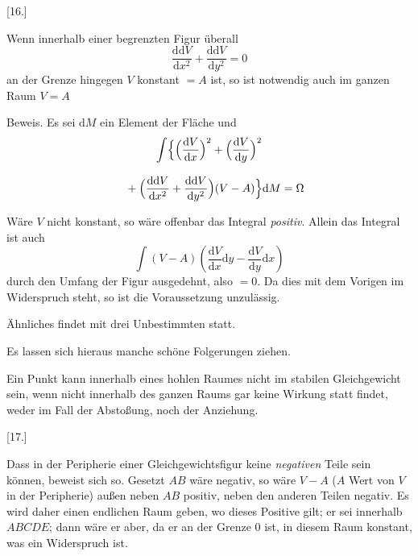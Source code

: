 \begingroup
\renewcommand{\arraystretch}{1.45}

\par\medskip{}\centerline{[16.]}\nobreak\smallskip
Wenn innerhalb einer begrenzten Figur überall
\[
\frac{\mathrm{dd}V}{\mathrm{d}x^2}
+\frac{\mathrm{dd}V}{\mathrm{d}y^2}=0
\]
an der Grenze hingegen $V$ konstant $=A$ ist, so ist notwendig auch im ganzen Raum $V=A$


Beweis. Es sei $\mathrm{d}M$ ein Element der Fläche und
\[
\begin{gathered}\int\Bigl\{
\Bigl(\frac{\mathrm{d}V}{\mathrm{d}x}\Bigr)^2
+\Bigl(\frac{\mathrm{d}V}{\mathrm{d}y}\Bigr)^2
\\[8pt]\quad{}+\Bigl(\frac{\mathrm{dd}V}{\mathrm{d}x^2}
+\frac{\mathrm{dd}V}{\mathrm{d}y^2}\Bigr)(V-A)
\Bigr\}\mathrm{d}M=\Omega\end{gathered}
\]



Wäre $V$ nicht konstant, so wäre offenbar das Integral \emph{positiv}. Allein das Integral ist auch
\[
\int(V-A)\left(\frac{\mathrm{d}V}{\mathrm{d}x}\mathrm{d}y
-\frac{\mathrm{d}V}{\mathrm{d}y}\mathrm{d}x\right)
\]
durch den Umfang der Figur ausgedehnt, also $=0$. Da dies mit dem Vorigen
im Widerspruch steht, so ist die Voraussetzung unzulässig.

Ähnliches findet mit drei Unbestimmten statt.

Es lassen sich hieraus manche schöne Folgerungen ziehen.

Ein Punkt kann innerhalb eines hohlen Raumes nicht im stabilen Gleichgewicht sein, wenn nicht innerhalb des ganzen Raums gar keine Wirkung statt
findet, weder im Fall der Abstoßung, noch der Anziehung.


\par\medskip{}\centerline{[17.]}\nobreak\smallskip
Dass in der Peripherie einer Gleichgewichtsfigur keine \emph{negativen} Teile sein
können, beweist sich so. Gesetzt $AB$ wäre negativ, so wäre $V-A$ ($A$ Wert
von $V$ in der Peripherie) außen neben $AB$ positiv, neben den anderen Teilen negativ. Es wird daher einen endlichen Raum geben, wo dieses Positive gilt;
er sei innerhalb $ABCDE$; dann wäre er aber, da er an der Grenze $0$ ist, in
diesem Raum konstant, was ein Widerspruch ist.

